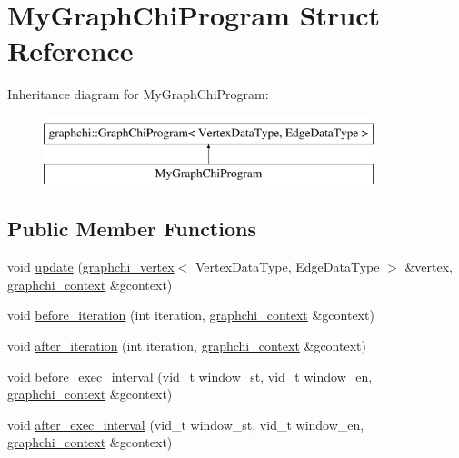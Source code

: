 \hypertarget{struct_my_graph_chi_program}{\section{My\-Graph\-Chi\-Program Struct Reference}
\label{struct_my_graph_chi_program}
}
Inheritance diagram for My\-Graph\-Chi\-Program\-:\begin{figure}[H]
\begin{center}
\leavevmode
\includegraphics[height=2.000000cm]{struct_my_graph_chi_program}
\end{center}
\end{figure}
\subsection*{Public Member Functions}
\begin{DoxyCompactItemize}
\item 
void \hyperlink{struct_my_graph_chi_program_abdfcf1ebfeaa35790060e9f79dff4209}{update} (\hyperlink{classgraphchi_1_1graphchi__vertex}{graphchi\-\_\-vertex}$<$ Vertex\-Data\-Type, Edge\-Data\-Type $>$ \&vertex, \hyperlink{structgraphchi_1_1graphchi__context}{graphchi\-\_\-context} \&gcontext)
\item 
void \hyperlink{struct_my_graph_chi_program_a2d16696c74cea6bdbb4f237595563b8a}{before\-\_\-iteration} (int iteration, \hyperlink{structgraphchi_1_1graphchi__context}{graphchi\-\_\-context} \&gcontext)
\item 
void \hyperlink{struct_my_graph_chi_program_a6e9c87461584131b1b7546a258a9e1ab}{after\-\_\-iteration} (int iteration, \hyperlink{structgraphchi_1_1graphchi__context}{graphchi\-\_\-context} \&gcontext)
\item 
void \hyperlink{struct_my_graph_chi_program_a77c27ea8780ebffa75618cd6a875f353}{before\-\_\-exec\-\_\-interval} (vid\-\_\-t window\-\_\-st, vid\-\_\-t window\-\_\-en, \hyperlink{structgraphchi_1_1graphchi__context}{graphchi\-\_\-context} \&gcontext)
\item 
void \hyperlink{struct_my_graph_chi_program_a3d208961e548f3c29cc3edc26c74e3ac}{after\-\_\-exec\-\_\-interval} (vid\-\_\-t window\-\_\-st, vid\-\_\-t window\-\_\-en, \hyperlink{structgraphchi_1_1graphchi__context}{graphchi\-\_\-context} \&gcontext)
\end{DoxyCompactItemize}
